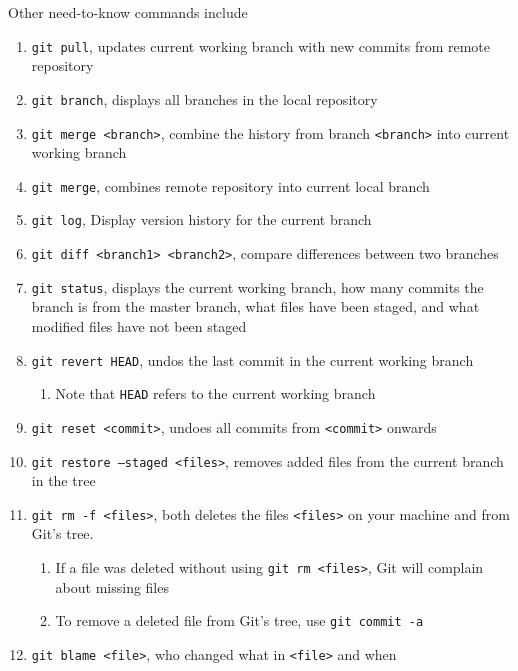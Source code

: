 \documentclass[11pt]{article}
\begin{document}
\noindent
Other need-to-know commands include

\begin{enumerate}
    \item \texttt{git pull}, updates current working branch with new commits from remote repository
    \item \texttt{git branch}, displays all branches in the local repository
    \item \texttt{git merge <branch>}, combine the history from branch \texttt{<branch>} into current working branch
    \item \texttt{git merge}, combines remote repository into current local branch
    \item \texttt{git log}, Display version history for the current branch
    \item \texttt{git diff <branch1> <branch2>}, compare differences between two branches
    \item \texttt{git status}, displays the current working branch, how many commits the branch is from the master branch, what files have been staged, and what modified files have not been staged
    \item \texttt{git revert HEAD}, undos the last commit in the current working branch
    \begin{enumerate}
        \item Note that \texttt{HEAD} refers to the current working branch
    \end{enumerate}
    \item \texttt{git reset <commit>}, undoes all commits from \texttt{<commit>} onwards
    \item \texttt{git restore --staged <files>}, removes added files from the current branch in the tree
    \item \texttt{git rm -f <files>}, both deletes the files \texttt{<files>} on your machine and from Git's tree.
    \begin{enumerate}
        \item If a file was deleted without using \texttt{git rm <files>}, Git will complain about missing files
        \item To remove a deleted file from Git's tree, use \texttt{git commit -a}
    \end{enumerate}
    \item \texttt{git blame <file>}, who changed what in \texttt{<file>} and when
\end{enumerate}
\end{document}
